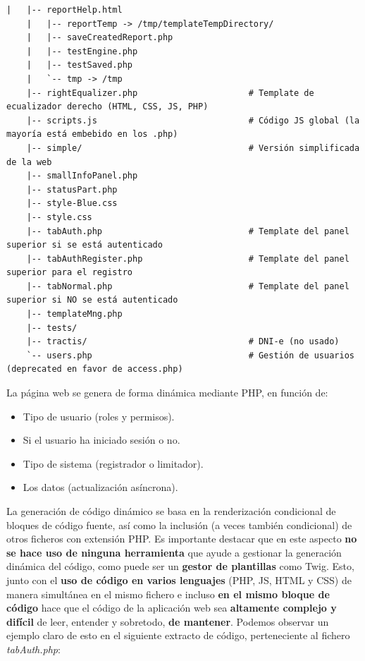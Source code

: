 \begin{lstlisting}[label={lst:lm7-www-treeview}, caption={Estructura de directorios y ficheros de la interfaz web}]
    |   |-- reportHelp.html
    |   |-- reportTemp -> /tmp/templateTempDirectory/
    |   |-- saveCreatedReport.php
    |   |-- testEngine.php
    |   |-- testSaved.php
    |   `-- tmp -> /tmp
    |-- rightEqualizer.php                      # Template de ecualizador derecho (HTML, CSS, JS, PHP)
    |-- scripts.js                              # Código JS global (la mayoría está embebido en los .php)
    |-- simple/                                 # Versión simplificada de la web
    |-- smallInfoPanel.php
    |-- statusPart.php
    |-- style-Blue.css
    |-- style.css
    |-- tabAuth.php                             # Template del panel superior si se está autenticado
    |-- tabAuthRegister.php                     # Template del panel superior para el registro
    |-- tabNormal.php                           # Template del panel superior si NO se está autenticado
    |-- templateMng.php
    |-- tests/
    |-- tractis/                                # DNI-e (no usado)
    `-- users.php                               # Gestión de usuarios (deprecated en favor de access.php)
\end{lstlisting}

La página web se genera de forma dinámica mediante PHP, en función de:
\begin{itemize}
    \item Tipo de usuario (roles y permisos).
    \item Si el usuario ha iniciado sesión o no.
    \item Tipo de sistema (registrador o limitador).
    \item Los datos (actualización asíncrona).
\end{itemize}

La generación de código dinámico se basa en la renderización condicional de bloques de código fuente, así como la inclusión (a veces también condicional) de otros ficheros con extensión PHP. Es importante destacar que en este aspecto \textbf{no se hace uso de ninguna herramienta} que ayude a gestionar la generación dinámica del código, como puede ser un \textbf{gestor de plantillas} como Twig. Esto, junto con el\textbf{ uso de código en varios lenguajes} (PHP, JS, HTML y CSS) de manera simultánea en el mismo fichero e incluso \textbf{en el mismo bloque de código} hace que el código de la aplicación web sea \textbf{altamente complejo y difícil} de leer, entender y sobretodo, \textbf{de mantener}. Podemos observar un ejemplo claro de esto en el siguiente extracto de código, perteneciente al fichero \textit{tabAuth.php}:\newline

